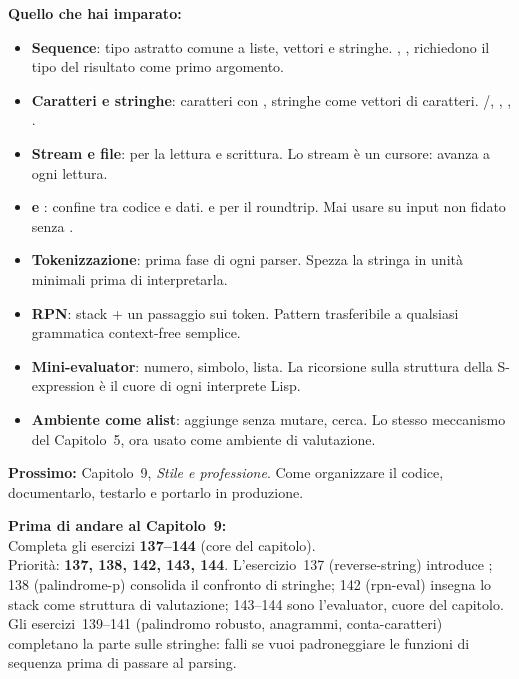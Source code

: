 \begin{tcolorbox}[
  enhanced,
  colback=csBlue!5, colframe=csBlue!40,
  arc=4pt, boxrule=0.6pt,
  left=14pt, right=14pt, top=12pt, bottom=12pt,
  before skip=16pt, after skip=16pt
]
\textbf{Quello che hai imparato:}

\medskip
\begin{itemize}
  \item \textbf{Sequence}: tipo astratto comune a liste, vettori
        e stringhe. , , 
        richiedono il tipo del risultato come primo argomento.
  \item \textbf{Caratteri e stringhe}: caratteri con \fn{\#\textbackslash{}},
        stringhe come vettori di caratteri. /,
        , , .
  \item \textbf{Stream e file}:  per la lettura
        e scrittura. Lo stream è un cursore: avanza a ogni lettura.
  \item \textbf{ e }: confine tra codice e dati.
         e  per il roundtrip.
        Mai usare  su input non fidato senza
        .
  \item \textbf{Tokenizzazione}: prima fase di ogni parser.
        Spezza la stringa in unità minimali prima di interpretarla.
  \item \textbf{RPN}: stack + un passaggio sui token.
        Pattern trasferibile a qualsiasi grammatica context-free semplice.
  \item \textbf{Mini-evaluator}: numero, simbolo, lista.
        La ricorsione sulla struttura della S-expression
        è il cuore di ogni interprete Lisp.
  \item \textbf{Ambiente come alist}:  aggiunge senza mutare,
         cerca. Lo stesso meccanismo del Capitolo~5,
        ora usato come ambiente di valutazione.
\end{itemize}

\medskip
\textbf{Prossimo:} Capitolo~9, \emph{Stile e professione}.
Come organizzare il codice, documentarlo, testarlo e portarlo
in produzione.
\end{tcolorbox}

\begin{workbook}
\textbf{Prima di andare al Capitolo~9:}\\[4pt]
Completa gli esercizi \textbf{137--144} (core del capitolo).\\[4pt]
Priorità: \textbf{137, 138, 142, 143, 144}.
L'esercizio~137 (reverse-string) introduce ;
138 (palindrome-p) consolida il confronto di stringhe;
142 (rpn-eval) insegna lo stack come struttura di valutazione;
143--144 sono l'evaluator, cuore del capitolo.\\[4pt]
Gli esercizi~139--141 (palindromo robusto, anagrammi, conta-caratteri)
completano la parte sulle stringhe: falli se vuoi
padroneggiare le funzioni di sequenza prima di passare al parsing.
\end{workbook}
